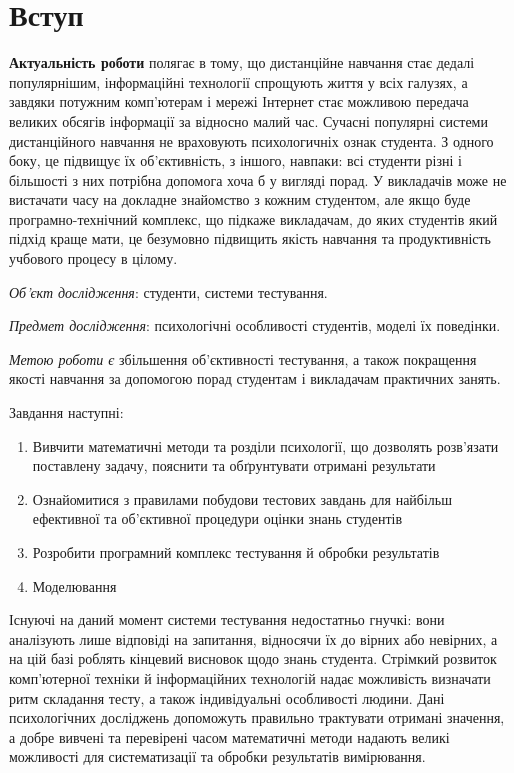 \chapter*{Вступ}

\textbf{Актуальність роботи} полягає в тому, що дистанційне навчання стає дедалі
популярнішим, інформаційні технології спрощують життя у всіх галузях,
а завдяки потужним комп’ютерам і мережі Інтернет стає можливою передача великих
обсягів інформації за відносно малий час.
Сучасні популярні системи дистанційного навчання не враховують психологичніх
ознак студента.
З одного боку, це підвищує їх об’єктивність, з іншого, навпаки: всі студенти
різні і більшості з них потрібна допомога хоча б у вигляді порад.
У викладачів може не вистачати часу на докладне знайомство з кожним студентом,
але якщо буде програмно-технічний комплекс, що підкаже викладачам, до яких
студентів який підхід краще мати, це безумовно підвищить якість навчання та
продуктивність учбового процесу в цілому.

\textit{Об’єкт дослідження}:
студенти, системи тестування.

\textit{Предмет дослідження}:
психологічні особливості студентів, моделі їх поведінки.

\textit{Метою роботи є}
збільшення об’єктивності тестування, а також покращення
якості навчання за допомогою порад студентам і викладачам практичних занять.

Завдання наступні:
\begin{enumerate}
  \item
    Вивчити математичні методи та розділи психології, що дозволять розв’язати
    поставлену задачу, пояснити та обґрунтувати отримані результати
  \item
    Ознайомитися з правилами побудови тестових завдань для найбільш
    ефективної та об’єктивної процедури оцінки знань студентів
  \item
    Розробити програмний комплекс тестування й обробки результатів
  \item
    Моделювання
\end{enumerate}

Існуючі на даний момент системи тестування недостатньо гнучкі: вони
аналізують лише відповіді на запитання, відносячи їх до вірних або невірних,
а на цій базі роблять кінцевий висновок щодо знань студента.
Стрімкий розвиток комп’ютерної техніки й інформаційних технологій надає
можливість визначати ритм складання тесту, а також індивідуальні особливості
людини.
Дані психологічних досліджень допоможуть правильно трактувати отримані
значення, а добре вивчені та перевірені часом математичні методи надають
великі можливості для систематизації та обробки результатів вимірювання.
